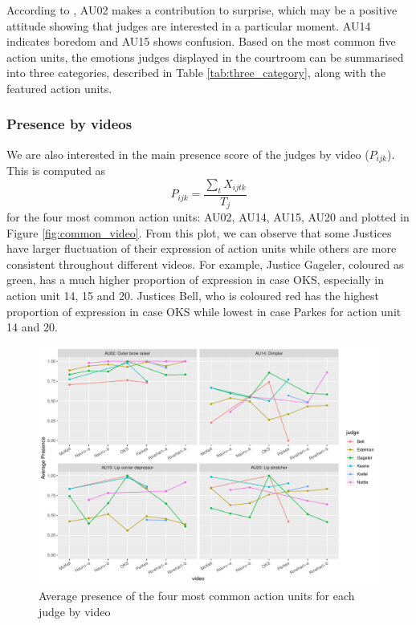 \documentclass{monashthesis}
\begin{document}
According to \textcite{ekman2002facial}, AU02 makes a contribution to surprise, which may be a positive attitude showing that judges are interested in a particular moment. AU14 indicates boredom and AU15 shows confusion. Based on the most common five action units, the emotions judges displayed in the courtroom can be summarised into three categories, described in Table \ref{tab:three_category}, along with the featured action units.

\hypertarget{presence-by-videos}{%
\subsubsection{Presence by videos}\label{presence-by-videos}}

We are also interested in the main presence score of the judges by video (\(P_{ijk}\)). This is computed as \[P_{ijk} = \frac{\sum_{t}X_{ijtk}}{T_j}\] for the four most common action units: AU02, AU14, AU15, AU20 and plotted in Figure \ref{fig:common_video}. From this plot, we can observe that some Justices have larger fluctuation of their expression of action units while others are more consistent throughout different videos. For example, Justice Gageler, coloured as green, has a much higher proportion of expression in case OKS, especially in action unit 14, 15 and 20. Justices Bell, who is coloured red has the highest proportion of expression in case OKS while lowest in case Parkes for action unit 14 and 20.

\begin{figure}

{\centering \includegraphics[width=1\linewidth]{figures/au-video-1} 

}

\caption{Average presence of the four most common action units for each judge by video\label{fig:common_video}}\label{fig:au-video}
\end{figure}
\end{document}
